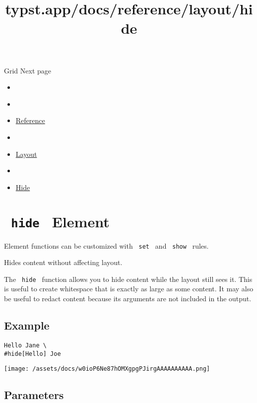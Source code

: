 { Grid } { Next page }


\title{typst.app/docs/reference/layout/hide}

\begin{itemize}
\tightlist
\item
  \href{/docs}{}
\item
  
\item
  \href{/docs/reference/}{Reference}
\item
  
\item
  \href{/docs/reference/layout/}{Layout}
\item
  
\item
  \href{/docs/reference/layout/hide/}{Hide}
\end{itemize}

\section{\texorpdfstring{\texttt{\ hide\ } {{ Element
}}}{ hide   Element }}\label{summary}

\label{element-tooltip}
Element functions can be customized with \texttt{\ set\ } and
\texttt{\ show\ } rules.

Hides content without affecting layout.

The \texttt{\ hide\ } function allows you to hide content while the
layout still \textquotesingle sees\textquotesingle{} it. This is useful
to create whitespace that is exactly as large as some content. It may
also be useful to redact content because its arguments are not included
in the output.

\subsection{Example}\label{example}

\begin{verbatim}
Hello Jane \
#hide[Hello] Joe
\end{verbatim}

\texttt{[image: /assets/docs/w0ioP6Ne87hOMXgpgPJirgAAAAAAAAAA.png]}

\subsection{\texorpdfstring{{ Parameters
}}{ Parameters }}\label{parameters}

